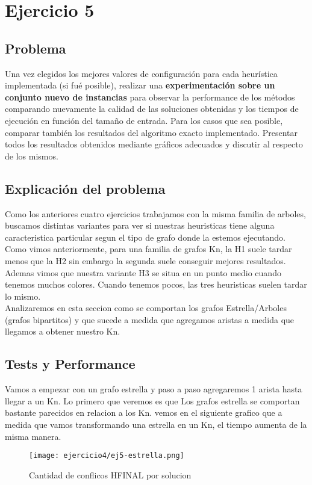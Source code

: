 \newpage
\pagebreak
\section{Ejercicio 5}
\subsection{Problema}
Una vez elegidos los mejores valores de configuraci\'on para cada heur\'istica implementada (si fu\'e posible), realizar una \textbf{experimentaci\'on sobre un conjunto nuevo de instancias}  para observar la performance de los m\'etodos comparando nuevamente la calidad de las soluciones obtenidas y los tiempos de ejecuci\'on en funci\'on del tama\~no de entrada. Para los casos que sea posible, comparar tambi\'en los resultados del algoritmo exacto implementado. Presentar todos los resultados obtenidos mediante gr\'aficos adecuados y discutir al respecto de los mismos.
\subsection{Explicaci\'on del problema}

Como los anteriores cuatro ejercicios trabajamos con la misma familia de arboles, buscamos distintas variantes para ver si nuestras heuristicas tiene alguna caracteristica particular segun el tipo de grafo donde la estemos ejecutando. Como vimos anteriormente, para una familia de grafos Kn, la H1 suele tardar menos que la H2 sin embargo la segunda suele conseguir mejores resultados. Ademas vimos que nuestra variante H3 se situa en un punto medio cuando tenemos muchos colores. Cuando tenemos pocos, las tres heuristicas suelen tardar lo mismo. \\
Analizaremos en esta seccion como se comportan los grafos Estrella/Arboles (grafos bipartitos) y que sucede a medida que agregamos aristas a medida que llegamos a obtener nuestro Kn. 
\subsection{Tests y Performance}
Vamos a empezar con un grafo estrella y paso a paso agregaremos 1 arista hasta llegar a un Kn. Lo primero que veremos es que Los grafos estrella se comportan bastante parecidos en relacion a los Kn. vemos en el siguiente grafico que a medida que vamos transformando una estrella en un Kn, el tiempo aumenta de la misma manera.
\pagebreak

\begin{figure}[h!]
\texttt{[image: ejercicio4/ej5-estrella.png]}
\centering
\caption{Cantidad de conflicos HFINAL por solucion}
\label{overflow3}
\end{figure}




